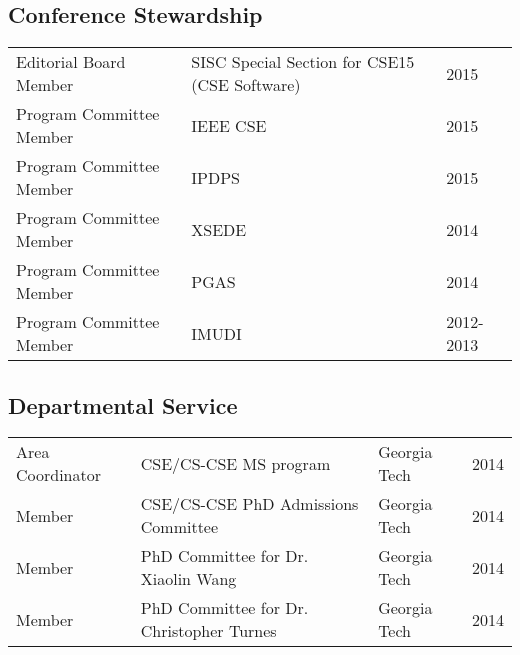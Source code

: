 \documentclass[letterpaper]{article}
\renewenvironment{itemize}{
  \begin{list}{}{
    \setlength{\leftmargin}{1.5em}
  }
}{
  \end{list}
}
\begin{document}
\subsection*{Conference Stewardship}
\begin{tabular}{lll}
Editorial Board Member & SISC Special Section for CSE15 (CSE Software) & 2015 \\
Program Committee Member & IEEE CSE & 2015 \\
Program Committee Member & IPDPS & 2015 \\
Program Committee Member & XSEDE & 2014 \\
Program Committee Member & PGAS & 2014 \\
Program Committee Member & IMUDI & 2012-2013 \\
\end{tabular}

\subsection*{Departmental Service}
\begin{tabular}{llll}
Area Coordinator & CSE/CS-CSE MS program & Georgia Tech & 2014 \\
Member           & CSE/CS-CSE PhD Admissions Committee  & Georgia Tech & 2014 \\
Member           & PhD Committee for Dr. Xiaolin Wang   & Georgia Tech & 2014 \\
Member           & PhD Committee for Dr. Christopher Turnes & Georgia Tech & 2014 
\end{tabular}
\end{document}
